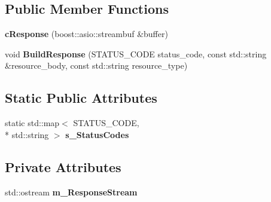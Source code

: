 \subsection*{Public Member Functions}
\begin{DoxyCompactItemize}
\item 
\hypertarget{classhttp__server_1_1cResponse_abdb27671f4818f6e6bcbc11530d18ebc}{{\bfseries c\-Response} (boost\-::asio\-::streambuf \&buffer)}\label{classhttp__server_1_1cResponse_abdb27671f4818f6e6bcbc11530d18ebc}

\item 
\hypertarget{classhttp__server_1_1cResponse_a4643375b14534fa335154c7a88884228}{void {\bfseries Build\-Response} (S\-T\-A\-T\-U\-S\-\_\-\-C\-O\-D\-E status\-\_\-code, const std\-::string \&resource\-\_\-body, const std\-::string resource\-\_\-type)}\label{classhttp__server_1_1cResponse_a4643375b14534fa335154c7a88884228}

\end{DoxyCompactItemize}
\subsection*{Static Public Attributes}
\begin{DoxyCompactItemize}
\item 
static std\-::map$<$ S\-T\-A\-T\-U\-S\-\_\-\-C\-O\-D\-E, \\*
std\-::string $>$ {\bfseries s\-\_\-\-Status\-Codes}
\end{DoxyCompactItemize}
\subsection*{Private Attributes}
\begin{DoxyCompactItemize}
\item 
\hypertarget{classhttp__server_1_1cResponse_a26980e4d210c8f2e766d3ae987262160}{std\-::ostream {\bfseries m\-\_\-\-Response\-Stream}}\label{classhttp__server_1_1cResponse_a26980e4d210c8f2e766d3ae987262160}

\end{DoxyCompactItemize}


